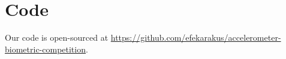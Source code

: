 \section{Code}

Our code is open-sourced at \url{https://github.com/efekarakus/accelerometer-biometric-competition}.
